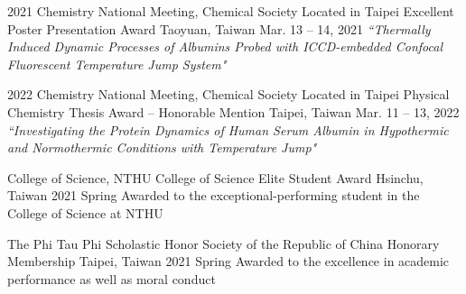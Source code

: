 


\begin{cventries}


\cventry
{2021 Chemistry National Meeting, Chemical Society Located in Taipei}
{Excellent Poster Presentation Award}
{Taoyuan, Taiwan}
{Mar. 13 -- 14, 2021}
{\textit{``Thermally Induced Dynamic Processes of Albumins Probed with ICCD-embedded Confocal Fluorescent Temperature Jump System"}}


\cventry
{2022 Chemistry National Meeting, Chemical Society Located in Taipei}
{Physical Chemistry Thesis Award -- Honorable Mention}
{Taipei, Taiwan}
{Mar. 11 -- 13, 2022}
{\textit{``Investigating the Protein Dynamics of Human Serum Albumin in Hypothermic and Normothermic Conditions with Temperature Jump"}}


\cventry
{College of Science, NTHU}
{College of Science Elite Student Award}
{Hsinchu, Taiwan}
{2021 Spring}
{Awarded to the exceptional-performing student in the College of Science at NTHU}


\cventry
{The Phi Tau Phi Scholastic Honor Society of the Republic of China}
{Honorary Membership}
{Taipei, Taiwan}
{2021 Spring}
{Awarded to the excellence in academic performance as well as moral conduct}


\end{cventries}